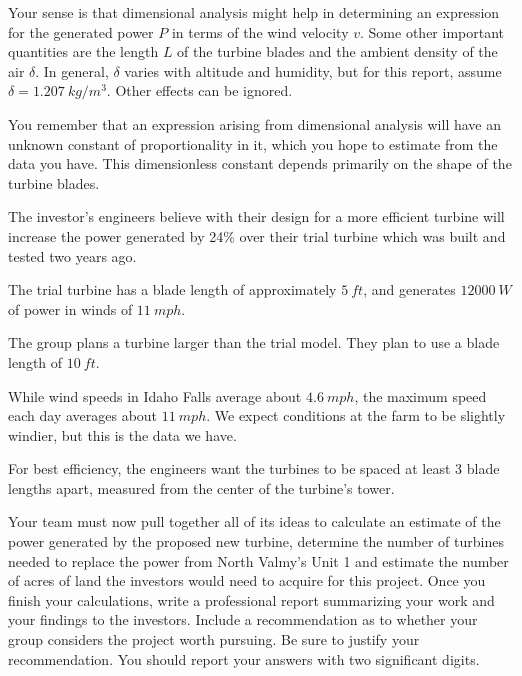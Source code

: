 \documentclass[11pt]{article}
\begin{document}
    \begin{compactitem}

        \item Your sense is that dimensional analysis might help in
        determining an expression for the generated power $P$ in terms of the
        wind velocity $v$. Some other important quantities are the length $L$ of the
        turbine blades and the ambient density of the air $\delta$. In
        general, $\delta$ varies with altitude and humidity, but for this
        report, assume $\delta = \SI{1.207}{kg/m^3}$. Other
        effects can be ignored.
        \item You remember that an expression arising from dimensional
        analysis will have an unknown constant of proportionality in it, which
        you hope to estimate from the data you have. This dimensionless
        constant depends primarily on the shape of the turbine blades.
        \item The investor's engineers believe with their design for a more
        efficient turbine will increase the power generated by 
        24\% over their trial turbine which was built and
        tested two years ago.
        \item The trial turbine has a blade length of approximately
        $\SI{5}{ft}$, and generates
        $\SI{12000}{W}$ of power in winds of
        $\SI{11}{mph}$.
        \item The group plans a turbine larger than the trial model. They plan
        to use a blade length of $\SI{10}{ft}$.
        \item While wind speeds in Idaho Falls average about
        $\SI{4.6}{mph}$, the maximum speed each day averages
        about $\SI{11}{mph}$. We expect conditions at the farm
        to be slightly windier, but this is the data we have.
        \item For best efficiency, the engineers want the turbines to be
        spaced at least $3$ blade lengths apart, measured from the center of
        the turbine's tower.

    \end{compactitem}


    Your team must now pull together all of its ideas to calculate an estimate
    of the power generated by the proposed new turbine, determine the number
    of turbines needed to replace the power from North Valmy's Unit
    1 and estimate the number of acres of land the investors would
    need to acquire for this project. Once you finish your calculations, write
    a professional report summarizing your work and your findings to the
    investors. Include a recommendation as to whether your group considers the
    project worth pursuing. Be sure to justify your recommendation. You should
    report your answers with two significant digits.
\end{document}
